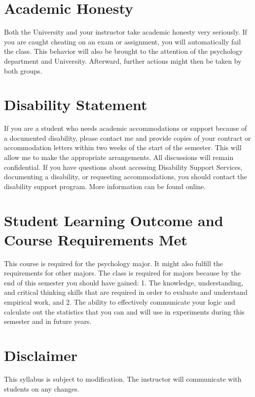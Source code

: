 \documentclass{article}
\begin{document}
\section{Academic Honesty}
Both the University and your instructor take academic honesty very seriously. If
you are caught cheating on an exam or assignment, you will automatically fail
the class. This behavior will also be brought to the attention of the psychology
department and University. Afterward, further actions might then be taken by
both groups.

\section{Disability Statement}
If you are a student who needs academic accommodations or support because of a
documented disability, please contact me and provide copies of your contract
or accommodation letters within two weeks of the start of the semester. This
will allow me to make the appropriate arrangements. All discussions will remain
confidential. If you have questions about accessing Disability Support Services,
documenting a disability, or requesting accommodations, you should contact the
disability support program. More information can be found online.

\section{Student Learning Outcome and Course Requirements Met}
This course is required for the psychology major. It might also fulfill the
requirements for other majors. The class is required for majors because by the
end of this semester you should have gained: 1. The knowledge, understanding,
and critical thinking skills that are required in order to evaluate and
understand empirical work, and 2. The ability to effectively communicate your
logic and calculate out the statistics that you can and will use in experiments
during this semester and in future years.

\section{Disclaimer}
This syllabus is subject to modification. The instructor will communicate with
students on any changes.
\end{document}
